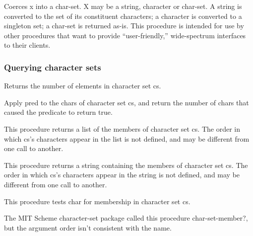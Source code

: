 \begin{entry}{%
  }

  Coerces x into
  a char-set. X may be a string, character or char-set. A string is
  converted to the set of its constituent characters; a character is
  converted to a singleton set; a char-set is returned as-is.  This
  procedure is intended for use by other procedures that want to
  provide ``user-friendly,'' wide-spectrum interfaces to their
  clients.
\end{entry}

\subsubsection{Querying character sets}

\begin{entry}{%
  }

  Returns the
  number of elements in character set cs.
\end{entry}

\begin{entry}{%
  }

  Apply
  pred to the chars of character set cs, and return the number of
  chars that caused the predicate to return true.
\end{entry}

\begin{entry}{%
  }

  This procedure returns a list of the members of character set
  cs. The order in which cs's characters appear in the list is not
  defined, and may be different from one call to another.
\end{entry}

\begin{entry}{%
  }

  This
  procedure returns a string containing the members of character set
  cs. The order in which cs's characters appear in the string is not
  defined, and may be different from one call to another.
\end{entry}

\begin{entry}{%
  }

  This procedure tests char for membership in character set cs.

  The MIT Scheme character-set package called this procedure
  char-set-member?, but the argument order isn't consistent with the
  name.
\end{entry}

